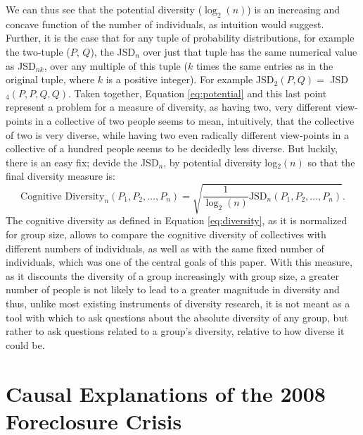 \documentclass[11pt]{article}
\begin{document}
We can thus see that the potential diversity ($\log_2(n)$) is an increasing and concave function of the number of individuals, as intuition would suggest.
Further, it is the case that for any tuple of probability distributions, for example the two-tuple ($P$, $Q$), the JSD$_n$ over just that tuple has the same numerical value as JSD$_{nk}$, over any multiple of this tuple ($k$ times the same entries as in the original tuple, where $k$ is a positive integer). For example JSD$_2(P, Q)=$ JSD$_4(P, P, Q, Q)$. Taken together, Equation \ref{eq:potential} and this last point represent a problem for a measure of diversity, as having two, very different view-points in a collective of two people seems to mean, intuitively, that the collective of two is very diverse, while having two even radically different view-points in a collective of a hundred people seems to be decidedly less diverse. But luckily, there is an easy fix; devide the JSD$_n$, by potential diversity log$_2(n)$ so that the final diversity measure is:
\begin{equation} \label{eq:diversity}
\text{Cognitive Diversity}_n(P_1, P_2, \ldots, P_n)=\sqrt{\frac{1}{\log_2(n)}\text{JSD}_n(P_1, P_2, \ldots, P_n)}.
\end{equation}
The cognitive diversity as defined in Equation \ref{eq:diversity}, as it is normalized for group size, allows to compare the cognitive diversity of collectives with different numbers of individuals, as well as with the same fixed number of individuals, which was one of the central goals of this paper. With this measure, as it discounts the diversity of a group increasingly with group size, a greater number of people is not likely to lead to a greater magnitude in diversity and thus, unlike most existing instruments of diversity research, it is not meant as a tool with which to ask questions about the absolute diversity of any group, but rather to ask questions related to a group's diversity, relative to how diverse it could be.
\section{Causal Explanations of the 2008 Foreclosure Crisis}
\label{sec-4}
\end{document}
